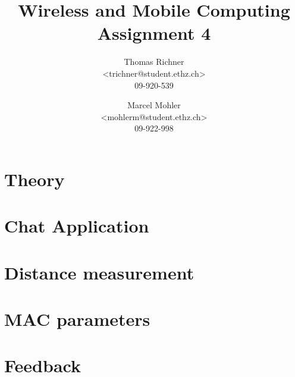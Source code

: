 \documentclass[11pt]{article}
\title{\textbf{Wireless and Mobile Computing 
\newline
Assignment 4}}
\author{
Thomas Richner\\
\textless trichner@student.ethz.ch\textgreater\\
09-920-539
\and
Marcel Mohler\\
\textless mohlerm@student.ethz.ch\textgreater\\
09-922-998
}
\begin{document}
\maketitle

\section{Theory}


\section{Chat Application}


\section{Distance measurement}


\section{MAC parameters}


\section{Feedback}

\end{document}
